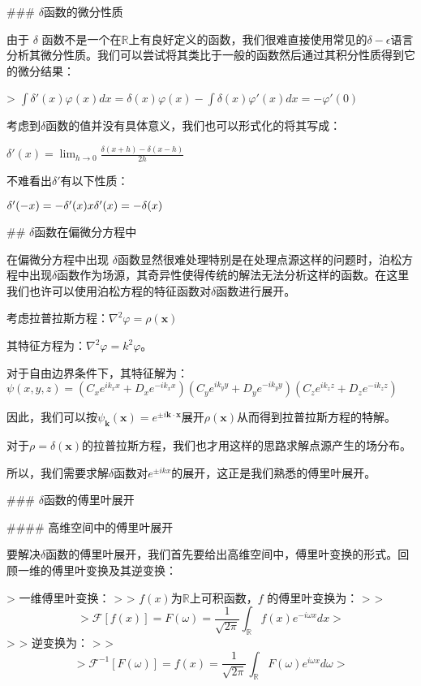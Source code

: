 \documentclass[lang=cn,10pt,newtx,bibend=biber,device=pad]{elegantbook}
\begin{document}
### $\delta$函数的微分性质

由于 $\delta$ 函数不是一个在$\mathbb{R}$上有良好定义的函数，我们很难直接使用常见的$\delta - \epsilon$语言分析其微分性质。我们可以尝试将其类比于一般的函数然后通过其积分性质得到它的微分结果：

> $\int\delta'(x)\varphi(x)dx=\delta(x)\varphi(x)-\int \delta(x)\varphi'(x)dx = -\varphi'(0)$

考虑到$\delta$函数的值并没有具体意义，我们也可以形式化的将其写成：

$\delta'(x) = \lim_{h\to0}\frac{\delta(x+h)-\delta(x-h)}{2h}$

不难看出$\delta'$有以下性质：

$\delta'(-x) = -\delta'(x)\\x\delta'(x) = -\delta(x)$  

## $\delta$函数在偏微分方程中

在偏微分方程中出现 $\delta$函数显然很难处理特别是在处理点源这样的问题时，泊松方程中出现$\delta$函数作为场源，其奇异性使得传统的解法无法分析这样的函数。在这里我们也许可以使用泊松方程的特征函数对$\delta$函数进行展开。

考虑拉普拉斯方程：$\nabla^2\varphi = \rho(\mathbf{x})$

其特征方程为：$\nabla^2\varphi = k^2 \varphi$。

对于自由边界条件下，其特征解为：$ \psi(x, y, z) = (C_x e^{i k_x x} + D_x e^{-i k_x x})(C_y e^{i k_y y} + D_y e^{-i k_y y})(C_z e^{i k_z z} + D_z e^{-i k_z z}) $

因此，我们可以按$\psi_\mathbf{k}(\mathbf{x}) = e^{\pm i\mathbf{k}\cdot\mathbf{x}}$展开$\rho(\mathbf{x})$从而得到拉普拉斯方程的特解。

对于$\rho=\delta(\mathbf{x})$的拉普拉斯方程，我们也才用这样的思路求解点源产生的场分布。

所以，我们需要求解$\delta$函数对$e^{\pm i kx}$的展开，这正是我们熟悉的傅里叶展开。

### $\delta$函数的傅里叶展开

#### 高维空间中的傅里叶展开

要解决$\delta$函数的傅里叶展开，我们首先要给出高维空间中，傅里叶变换的形式。回顾一维的傅里叶变换及其逆变换：

> 一维傅里叶变换：
>
> $f(x)$为$\mathbb{R}$上可积函数，$f$ 的傅里叶变换为：
>
> $$
> \mathcal{F}[f(x)]=F(\omega)=\frac{1}{\sqrt{2\pi}}\int_{\mathbb{R}}f(x)e^{-i\omega x}dx
> $$
>
> 逆变换为：
>
> $$
> \mathcal{F}^{-1}[F(\omega)]=f(x)=\frac{1}{\sqrt{2\pi}}\int_{\mathbb{R}}F(\omega)e^{i\omega x}d\omega
> $$
\end{document}
